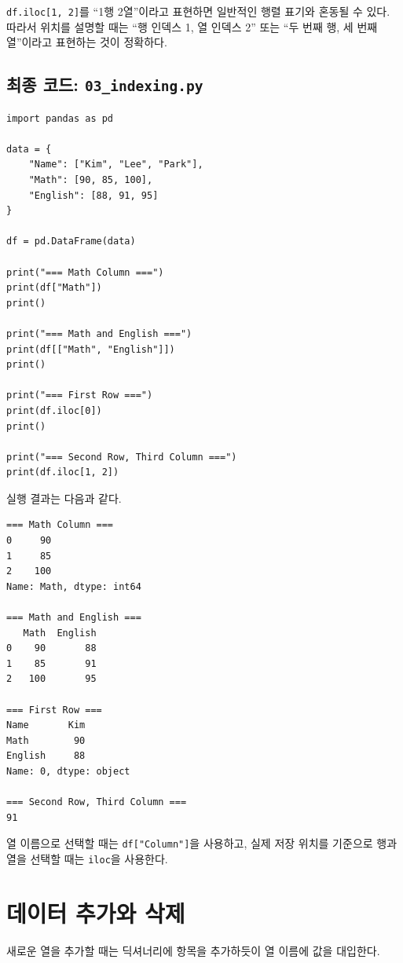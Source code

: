 \documentclass[11pt,a4paper]{article}
\begin{document}
\texttt{df.iloc[1, 2]}를 ``1행 2열''이라고 표현하면 일반적인 행렬 표기와 혼동될 수 있다. 따라서 위치를 설명할 때는 ``행 인덱스 1, 열 인덱스 2'' 또는 ``두 번째 행, 세 번째 열''이라고 표현하는 것이 정확하다.

\subsection{최종 코드: \texttt{03\_indexing.py}}

\begin{lstlisting}
import pandas as pd

data = {
    "Name": ["Kim", "Lee", "Park"],
    "Math": [90, 85, 100],
    "English": [88, 91, 95]
}

df = pd.DataFrame(data)

print("=== Math Column ===")
print(df["Math"])
print()

print("=== Math and English ===")
print(df[["Math", "English"]])
print()

print("=== First Row ===")
print(df.iloc[0])
print()

print("=== Second Row, Third Column ===")
print(df.iloc[1, 2])
\end{lstlisting}

실행 결과는 다음과 같다.

\begin{verbatim}
=== Math Column ===
0     90
1     85
2    100
Name: Math, dtype: int64

=== Math and English ===
   Math  English
0    90       88
1    85       91
2   100       95

=== First Row ===
Name       Kim
Math        90
English     88
Name: 0, dtype: object

=== Second Row, Third Column ===
91
\end{verbatim}

\begin{importantbox}
열 이름으로 선택할 때는 \texttt{df["Column"]}을 사용하고, 실제 저장 위치를 기준으로 행과 열을 선택할 때는 \texttt{iloc}을 사용한다.
\end{importantbox}

\section{데이터 추가와 삭제}

새로운 열을 추가할 때는 딕셔너리에 항목을 추가하듯이 열 이름에 값을 대입한다.
\end{document}
